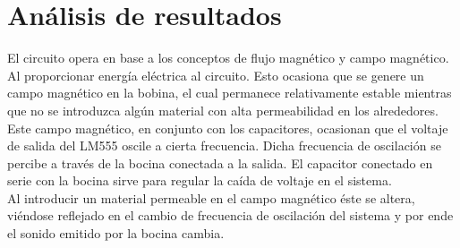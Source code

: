 \section{An\'alisis de resultados}
El circuito opera en base a los conceptos de flujo magn\'etico
y campo magn\'etico. Al proporcionar energ\'ia el\'ectrica al 
circuito. Esto ocasiona que se genere un campo magn\'etico en 
la bobina, el cual permanece relativamente estable mientras 
que no se introduzca alg\'un material con alta permeabilidad
en los alrededores.\\
Este campo magn\'etico, en conjunto con los capacitores, 
ocasionan que el voltaje de salida del LM555 oscile a cierta 
frecuencia. Dicha frecuencia de oscilaci\'on se percibe a 
trav\'es de la bocina conectada a la salida. El capacitor 
conectado en serie con la bocina sirve para regular la ca\'ida
de voltaje en el sistema.\\
Al introducir un material permeable en el campo magn\'etico 
\'este se altera, vi\'endose reflejado en el cambio de 
frecuencia de oscilaci\'on del sistema y por ende el sonido 
emitido por la bocina cambia.
